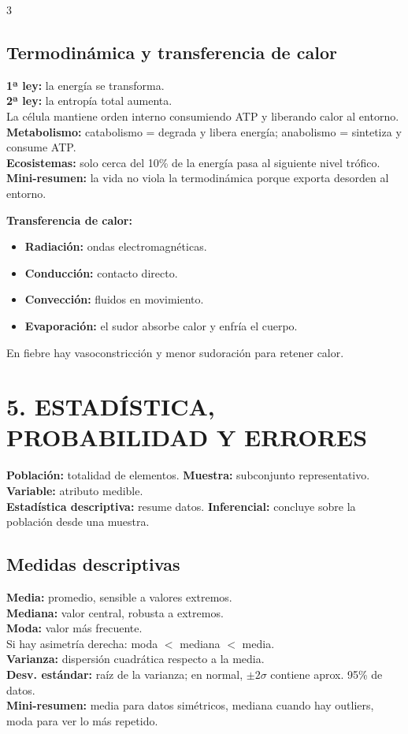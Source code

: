 \documentclass[9pt,landscape,letterpaper]{extarticle}
\begin{document}
\begin{multicols*}{3}
	\subsection{Termodinámica y transferencia de calor}
	\textbf{1ª ley:} la energía se transforma.\\
	\textbf{2ª ley:} la entropía total aumenta.\\
	La célula mantiene orden interno consumiendo ATP y liberando calor al entorno.\\
	\textbf{Metabolismo:} catabolismo = degrada y libera energía; anabolismo = sintetiza y consume ATP.\\
	\textbf{Ecosistemas:} solo cerca del 10\% de la energía pasa al siguiente nivel trófico.\\
	\textbf{Mini-resumen:} la vida no viola la termodinámica porque exporta desorden al entorno.

	\textbf{Transferencia de calor:}
	\begin{itemize}
		\item \textbf{Radiación:} ondas electromagnéticas.
		\item \textbf{Conducción:} contacto directo.
		\item \textbf{Convección:} fluidos en movimiento.
		\item \textbf{Evaporación:} el sudor absorbe calor y enfría el cuerpo.
	\end{itemize}
	En fiebre hay vasoconstricción y menor sudoración para retener calor.

	\section{5. ESTADÍSTICA, PROBABILIDAD Y ERRORES}
	\textbf{Población:} totalidad de elementos. \textbf{Muestra:} subconjunto representativo. \textbf{Variable:} atributo medible.\\
	\textbf{Estadística descriptiva:} resume datos. \textbf{Inferencial:} concluye sobre la población desde una muestra.

	\subsection{Medidas descriptivas}
	\textbf{Media:} promedio, sensible a valores extremos.\\
	\textbf{Mediana:} valor central, robusta a extremos.\\
	\textbf{Moda:} valor más frecuente.\\
	Si hay asimetría derecha: moda $<$ mediana $<$ media.\\
	\textbf{Varianza:} dispersión cuadrática respecto a la media.\\
	\textbf{Desv. estándar:} raíz de la varianza; en normal, $\pm 2\sigma$ contiene aprox. 95\% de datos.\\
	\textbf{Mini-resumen:} media para datos simétricos, mediana cuando hay outliers, moda para ver lo más repetido.


\end{multicols*}
\end{document}
